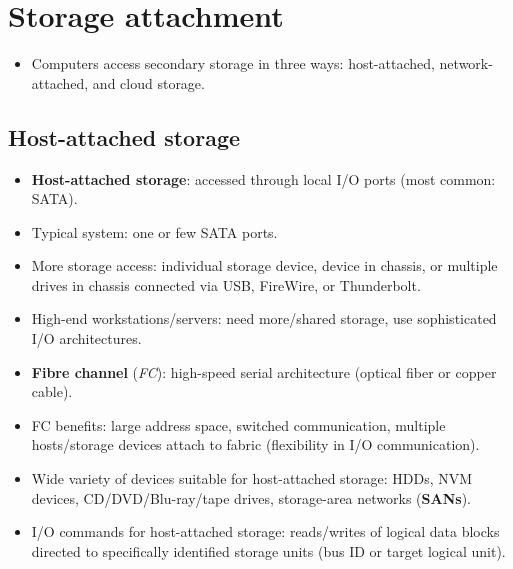 \section{Storage attachment}

\begin{itemize}
    \item Computers access secondary storage in three ways: host-attached, network-attached, and cloud storage.
\end{itemize}

\subsection{Host-attached storage}
\begin{itemize}
    \item \textbf{Host-attached storage}: accessed through local I/O ports (most common: SATA).
    \item Typical system: one or few SATA ports.
    \item More storage access: individual storage device, device in chassis, or multiple drives in chassis connected via USB, FireWire, or Thunderbolt.
    \item High-end workstations/servers: need more/shared storage, use sophisticated I/O architectures.
    \item \textbf{Fibre channel} (\textit{FC}): high-speed serial architecture (optical fiber or copper cable).
    \item FC benefits: large address space, switched communication, multiple hosts/storage devices attach to fabric (flexibility in I/O communication).
    \item Wide variety of devices suitable for host-attached storage: HDDs, NVM devices, CD/DVD/Blu-ray/tape drives, storage-area networks (\textbf{SANs}).
    \item I/O commands for host-attached storage: reads/writes of logical data blocks directed to specifically identified storage units (bus ID or target logical unit).
\end{itemize}

